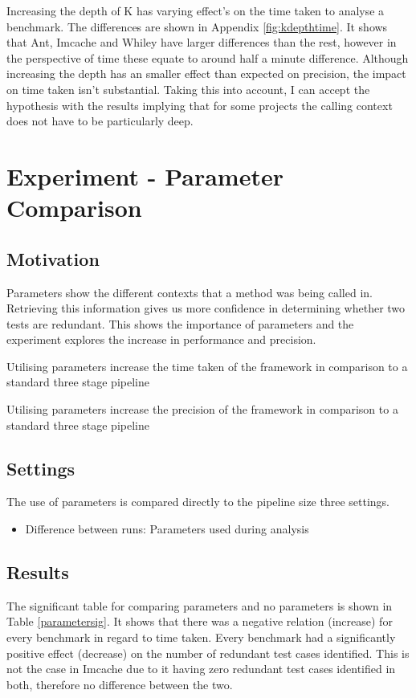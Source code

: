 Increasing the depth of K has varying effect's on the time taken to analyse a benchmark. The differences are shown in Appendix \ref{fig:kdepthtime}. It shows that Ant, Imcache and Whiley have larger differences than the rest, however in the perspective of time these equate to around half a minute difference. Although increasing the depth has an smaller effect than expected on precision, the impact on time taken isn't substantial. Taking this into account, I can accept the hypothesis with the results implying that for some projects the calling context does not have to be particularly deep.

\section{Experiment  - Parameter Comparison}
\label{sec:param}

\subsection{Motivation}
Parameters show the different contexts that a method was being called in. Retrieving this information gives us more confidence in determining whether two tests are redundant. This shows the importance of parameters and the experiment explores the increase in performance and precision.

\begin{hyp}
Utilising parameters increase the time taken of the framework in comparison to a standard three stage pipeline
\end{hyp}

\begin{hyp}
Utilising parameters increase the precision of the framework in comparison to a standard three stage pipeline
\end{hyp}

\subsection{Settings}
The use of parameters is compared directly to the pipeline size three settings.

\begin{itemize}
\item Difference between runs: Parameters used during analysis
\end{itemize}

\subsection{Results}
The significant table for comparing parameters and no parameters is shown in Table \ref{parametersig}. It shows that there was a negative relation (increase) for every benchmark in regard to time taken. Every benchmark had a significantly positive effect (decrease) on the number of redundant test cases identified. This is not the case in Imcache due to it having zero redundant test cases identified in both, therefore no difference between the two.

